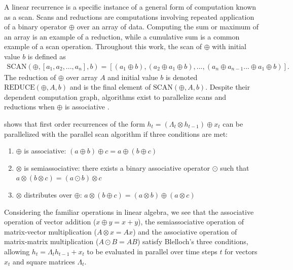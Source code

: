 \documentclass{article}
\providecommand{\scan}{\text{SCAN}}
\providecommand{\reduce}{\text{REDUCE}}
\begin{document}
A linear recurrence is a specific instance of a general form of computation known as a scan.
Scans and reductions are computations involving repeated application of a binary
operator $\oplus$ over an array of data. Computing the sum or maximum
of an array is an example of a reduction, while a cumulative sum is a common
example of a scan operation. Throughout this work, the scan of $\oplus$ with
initial value $b$ is defined as
\begin{align*}
\scan(\oplus, [a_1, a_2, ..., a_n], b) = [(a_1 \oplus b), (a_2 \oplus a_1 \oplus b), ..., (a_n \oplus a_{n-1} ... \oplus a_1 \oplus b)].
\end{align*}
The reduction of $\oplus$ over array $A$ and initial value $b$ is denoted
$\reduce(\oplus, A, b)$ and is the final element of $\scan(\oplus, A, b)$.
Despite their dependent computation graph, algorithms exist to parallelize scans
and reductions when $\oplus$ is associative \citep{ladner1980parallel}.

\citet{blelloch1990prefix} shows that first order recurrences of the form
$h_t = (\Lambda_t \otimes h_{t-1}) \oplus x_t$ can be parallelized with
the parallel scan algorithm if three conditions are met:

\begin{enumerate}
\item $\oplus$ is associative: $(a \oplus b) \oplus c = a \oplus (b \oplus c)$
\item $\otimes$ is semiassociative: there exists a binary associative operator
$\odot$ such that $a \otimes (b \otimes c) = (a \odot b) \otimes c$
\item $\otimes$ distributes over $\oplus$: $a\otimes(b\oplus c) = (a\otimes b) \oplus (a \otimes c)$
\end{enumerate}

Considering the familiar operations in linear algebra, we see that the
associative operation of vector addition
($x \oplus y = x + y$), the
semiassociative operation of matrix-vector multiplication
($A \otimes x = Ax$) and the associative operation of
matrix-matrix multiplication ($A \odot B=AB$) satisfy Blelloch's three
conditions, allowing $h_t = \Lambda_t h_{t-1} + x_t$ to be evaluated in parallel
over time steps \(t\) for vectors $x_t$ and square matrices $\Lambda_t$.
\end{document}
